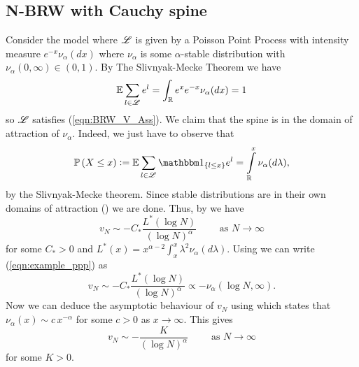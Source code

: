\subsection{N-BRW with Cauchy spine}
Consider the model where $\mathscr{L}$ is given by a Poisson Point Process with intensity measure $e^{-x} \nu_\alpha (dx)$ where $\nu_\alpha$ is some $\alpha$-stable distribution with $\nu_\alpha(0, \infty) \in (0, 1)$. By The Slivnyak-Mecke Theorem \cite[Theorem 1.13]{baccelli2009stochastic} we have
\begin{equation}\nonumber
\mathbb{E} \sum\limits_{l \in \mathscr{L}} e^l = \int_{\mathbb{R}} e^x e^{-x} \nu_\alpha(dx) = 1
\end{equation}
so $\mathscr{L}$ satisfies (\ref{eqn:BRW_V_Ass}). We claim that the spine is in the domain of attraction of $\nu_\alpha$. Indeed, we just have to observe that 
\begin{equation}
\Pr{X \leq x} \defeq \E \sum\limits_{l \in \scr{L}} \Ind_{\{ l \leq x \}} e^l  = \int\limits^x_\R \nu_\alpha(d \lambda), 
\end{equation}
 by the Slivnyak-Mecke theorem. Since stable distributions are in their own domains of attraction (\cite[p. 576]{feller1957introduction}) we are done. Thus, by \cite[Theorem 1.1]{mallein2018n} we have
 \begin{equation}\label{eqn:example_ppp}
v_N \sim - C_* \frac{L^*(\log N)}{(\log N)^\alpha} \qquad\text{ as }N \to \infty
 \end{equation}
for some $C_* > 0$ and $L^*(x) = x^{\alpha - 2} \int^x_x \lambda^2 \nu_\alpha(d \lambda)$. Using \cite[(5.18) and (5.22)]{feller1957introduction} we can write (\ref{eqn:example_ppp}) as 
\begin{equation}\label{eqn:example_ppp2}
v_N \sim - C_* \frac{L^*(\log N)}{(\log N)^\alpha} \propto - \nu_\alpha(\log N, \infty).  
\end{equation}
Now we can deduce the asymptotic behaviour of $v_N$ using \cite[Theorem 1.12]{nolan2003stable} which states that $\nu_\alpha(x) \sim c\,x^{-\alpha}$ for some $c > 0$ as $x \to \infty$. This gives 
\begin{equation}
v_N \sim - \frac{K}{(\log N)^\alpha}\qquad\text{ as }N \to \infty
\end{equation}
for some $K > 0$. 





